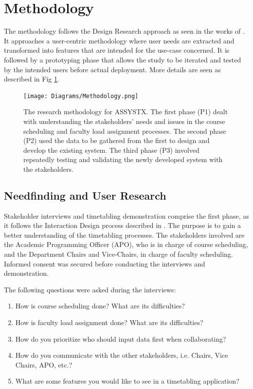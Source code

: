 
\section{Methodology}
The methodology follows the Design Research approach as seen in the works of \cite{deja2018myosl, deja2018flow, chan2019applying}. It approaches a user-centric methodology where user needs are extracted and transformed into features that are intended for the use-case concerned. It is followed by a prototyping phase that allows the study to be iterated and tested by the intended users before actual deployment. More details are seen as described in Fig \ref{fig:pipelinediagram}. 
\begin{figure}[h]
   \centering
   \texttt{[image: Diagrams/Methodology.png]}
   \caption{The research methodology for ASSYSTX. The first phase (P1) dealt with understanding the stakeholders' needs and issues in the course scheduling and faculty load assignment processes. The second phase (P2) used the data to be gathered from the first to design and develop the existing system. The third phase (P3) involved repeatedly testing and validating the newly developed system with the stakeholders.}
    \label{fig:pipelinediagram}
\end{figure}


\subsection{Needfinding and User Research}
Stakeholder interviews and timetabling demonstration comprise the first phase, as it follows the Interaction Design process described in \cite{Dix:2003:HI:1203012}. The purpose is to gain a better understanding of the timetabling processes. The stakeholders involved are the Academic Programming Officer (APO), who is in charge of course scheduling, and the Department Chairs and Vice-Chairs, in charge of faculty scheduling. Informed consent was secured before conducting the interviews and demonstration.

The following questions were asked during the interviews:
\begin{enumerate}
    \item How is course scheduling done? What are its difficulties?
    \item How is faculty load assignment done? What are its difficulties?
    \item How do you prioritize who should input data first when collaborating?
    \item How do you communicate with the other stakeholders, i.e. Chairs, Vice Chairs, APO, etc.?
    \item What are some features you would like to see in a timetabling application?
\end{enumerate}

